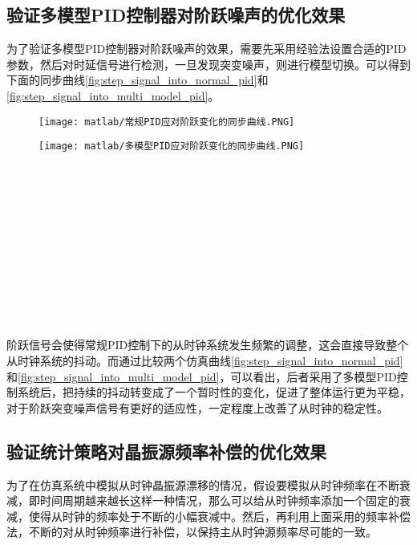 \subsection{验证多模型PID控制器对阶跃噪声的优化效果}
为了验证多模型PID控制器对阶跃噪声的效果，需要先采用经验法设置合适的PID参数，然后对时延信号进行检测，一旦发现突变噪声，则进行模型切换。可以得到下面的同步曲线\ref{fig:step_signal_into_normal_pid}和\ref{fig:step_signal_into_multi_model_pid}。
\begin{figure}[!hbp]
  \centering
  \begin{minipage}[b]{0.7\textwidth}
   \captionstyle{\centering}
   \centering
   \texttt{[image: matlab/常规PID应对阶跃变化的同步曲线.PNG]}
  \end{minipage}     
\end{figure}
\begin{figure}[htbp]
  \centering
  \begin{minipage}[b]{0.7\textwidth}
   \captionstyle{\centering}
   \centering
   \texttt{[image: matlab/多模型PID应对阶跃变化的同步曲线.PNG]}
  \end{minipage}     
\end{figure}
\\ \\ \\ \\ \\ \\ \\ \\ \\ \\ \\ 

阶跃信号会使得常规PID控制下的从时钟系统发生频繁的调整，这会直接导致整个从时钟系统的抖动。而通过比较两个仿真曲线\ref{fig:step_signal_into_normal_pid}和\ref{fig:step_signal_into_multi_model_pid}，可以看出，后者采用了多模型PID控制系统后，把持续的抖动转变成了一个暂时性的变化，促进了整体运行更为平稳，对于阶跃突变噪声信号有更好的适应性，一定程度上改善了从时钟的稳定性。

\subsection{验证统计策略对晶振源频率补偿的优化效果}
为了在仿真系统中模拟从时钟晶振源漂移的情况，假设要模拟从时钟频率在不断衰减，即时间周期越来越长这样一种情况，那么可以给从时钟频率添加一个固定的衰减，使得从时钟的频率处于不断的小幅衰减中。然后，再利用上面采用的频率补偿法，不断的对从时钟频率进行补偿，以保持主从时钟源频率尽可能的一致。

